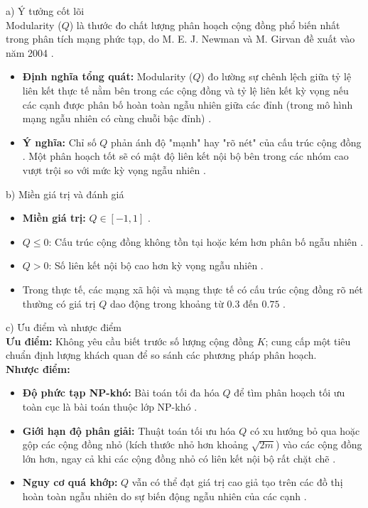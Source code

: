\documentclass[14pt,a4paper]{extarticle}
\begin{document}
\noindent a) Ý tưởng cốt lõi
\\
Modularity ($Q$) là thước đo chất lượng phân hoạch cộng đồng phổ biến nhất trong phân tích mạng phức tạp, do M. E. J. Newman và M. Girvan đề xuất vào năm 2004 \cite{Chen2019}.
\begin{itemize}
    \item \textbf{Định nghĩa tổng quát:} Modularity ($Q$) đo lường sự chênh lệch giữa tỷ lệ liên kết thực tế nằm bên trong các cộng đồng và tỷ lệ liên kết kỳ vọng nếu các cạnh được phân bố hoàn toàn ngẫu nhiên giữa các đỉnh (trong mô hình mạng ngẫu nhiên có cùng chuỗi bậc đỉnh) \cite{Beldi2025}.
    \item \textbf{Ý nghĩa:} Chỉ số $Q$ phản ánh độ "mạnh" hay "rõ nét" của cấu trúc cộng đồng \cite{Newman2004, Beldi2025}. Một phân hoạch tốt sẽ có mật độ liên kết nội bộ bên trong các nhóm cao vượt trội so với mức kỳ vọng ngẫu nhiên \cite{Newman2004}.
\end{itemize}

\noindent b) Miền giá trị và đánh giá
\begin{itemize}
    \item \textbf{Miền giá trị:} $Q \in [-1, 1]$ \cite{Said2018, Beldi2025}.
    \item $Q \le 0$: Cấu trúc cộng đồng không tồn tại hoặc kém hơn phân bố ngẫu nhiên \cite{Baraa2021}.
    \item $Q > 0$: Số liên kết nội bộ cao hơn kỳ vọng ngẫu nhiên \cite{Newman2004, Baraa2021}.
    \item Trong thực tế, các mạng xã hội và mạng thực tế có cấu trúc cộng đồng rõ nét thường có giá trị $Q$ dao động trong khoảng từ $0.3$ đến $0.75$ \cite{Baraa2021}.
\end{itemize}

\noindent c) Ưu điểm và nhược điểm
\\
\textbf{Ưu điểm:} Không yêu cầu biết trước số lượng cộng đồng $K$; cung cấp một tiêu chuẩn định lượng khách quan để so sánh các phương pháp phân hoạch.
\\
\textbf{Nhược điểm:}
\begin{itemize}
    \item \textbf{Độ phức tạp NP-khó:} Bài toán tối đa hóa $Q$ để tìm phân hoạch tối ưu toàn cục là bài toán thuộc lớp NP-khó \cite{Said2018, Baraa2021}.
    \item \textbf{Giới hạn độ phân giải:} Thuật toán tối ưu hóa $Q$ có xu hướng bỏ qua hoặc gộp các cộng đồng nhỏ (kích thước nhỏ hơn khoảng $\sqrt{2m}$) vào các cộng đồng lớn hơn, ngay cả khi các cộng đồng nhỏ có liên kết nội bộ rất chặt chẽ \cite{Gong2016}.
    \item \textbf{Nguy cơ quá khớp:} $Q$ vẫn có thể đạt giá trị cao giả tạo trên các đồ thị hoàn toàn ngẫu nhiên do sự biến động ngẫu nhiên của các cạnh \cite{Gong2016}.
\end{itemize}
\end{document}
